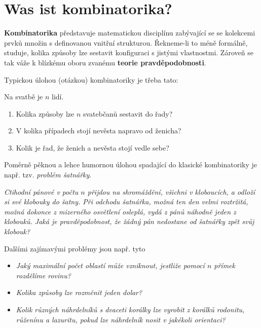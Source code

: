 \section{Was ist kombinatorika?}

\textbf{Kombinatorika} představuje matematickou disciplínu zabývající se se kolekcemi prvků množin s definovanou vnitřní strukturou. Řekneme-li to méně formálně, studuje, kolika způsoby lze sestavit konfiguraci s jistými vlastnostmi. Zároveň se tak váže k blízkému oboru zvanému \textbf{teorie pravděpodobnosti}. \par
Typickou úlohou (otázkou) kombinatoriky je třeba tato:

\begin{task}\label{task:intro}
    Na svatbě je $n$ lidí.
    \begin{enumerate}[label=(\alph*)]
        \item Kolika způsoby lze $n$ svatebčanů sestavit do řady?
        \item V kolika případech stojí nevěsta napravo od ženicha?
        \item Kolik je řad, že ženich a nevěsta stojí vedle sebe?
    \end{enumerate}
\end{task}

Poměrně pěknou a lehce humornou úlohou spadající do klasické kombinatoriky je např. tzv. \emph{problém šatnářky}.

\begin{task}\label{task:problem_satnarky}
    \textit{Ctihodní pánové v počtu $n$ přijdou na shromáždění, všichni v kloboucích, a odloží si své klobouky do šatny. Při odchodu šatnářka, možná ten den velmi roztržitá, možná dokonce z mizerného osvětlení osleplá, vydá z pánů náhodně jeden z klobouků. Jaká je pravděpodobnost, že žádný pán nedostane od šatnářky zpět svůj klobouk?} \citep[str.~105]{MatousekNesetril2009}
\end{task}

Dalšími zajímavými problémy jsou např. tyto

\begin{task}
    \begin{itemize}
        \item \textit{Jaký maximální počet oblastí může vzniknout, jestliže pomocí $n$ přímek rozdělíme rovinu?} \citep[str. 38]{Slavik2022}
        \item \textit{Kolika způsoby lze rozměnit jeden dolar?} \citep[str. 130]{HarrisHirstMossinghoff2010}
        \item \textit{Kolik různých náhrdelníků s dvaceti korálky lze vyrobit z korálků rodonitu, růženínu a lazuritu, pokud lze náhrdelník nosit v jakékoli orientaci?} \citep[str. 130]{HarrisHirstMossinghoff2010}
    \end{itemize}
\end{task}

